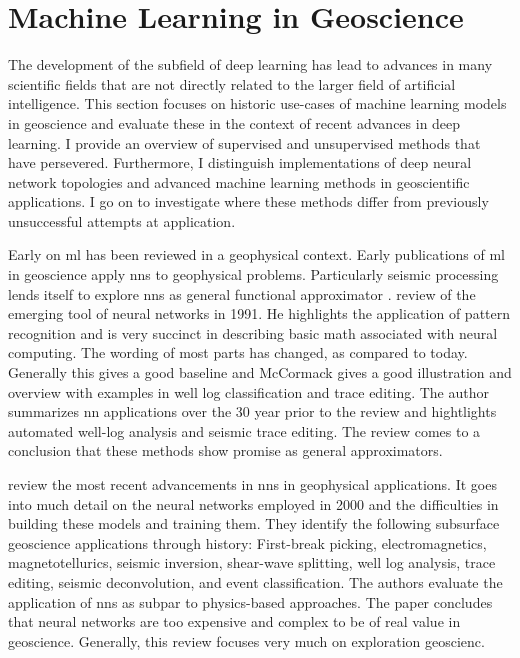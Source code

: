 \section{Machine Learning in Geoscience}
The development of the subfield of deep learning has lead to advances in many scientific fields that are not directly related to the larger field of artificial intelligence. This section focuses on historic use-cases of machine learning models in geoscience and evaluate these in the context of recent advances in deep learning. I provide an overview of supervised and unsupervised methods that have persevered. Furthermore, I distinguish implementations of deep neural network topologies and advanced machine learning methods in geoscientific applications. I go on to investigate where these methods differ from previously unsuccessful attempts at application.

Early on \acf{ml} has been reviewed in a geophysical context. Early publications of \ac{ml} in geoscience apply \acp{nn} to geophysical problems. Particularly seismic processing lends itself to explore \acp{nn} as general functional approximator \citep{Hornik1989-bl}. \citet{McCormack1991-pm} review of the emerging tool of neural networks in 1991. He highlights the application of pattern recognition and is very succinct in describing basic math associated with neural computing. The wording of most parts has changed, as compared to today. Generally this gives a good baseline and McCormack gives a good illustration and overview with examples in well log classification and trace editing. The author summarizes \ac{nn} applications over the 30 year prior to the review and hightlights automated well-log analysis and seismic trace editing. The review comes to a conclusion that these methods show promise as general approximators. 

\citet{Van_der_Baan2000-jz} review the most recent advancements in \acfp{nn} in geophysical applications. It goes into much detail on the neural networks employed in 2000 and the difficulties in building these models and training them. They identify the following subsurface geoscience applications through history: First-break picking, electromagnetics, magnetotellurics, seismic inversion, shear-wave splitting, well log analysis, trace editing, seismic deconvolution, and event classification. The authors evaluate the application of \acp{nn} as subpar to physics-based approaches. The paper concludes that neural networks are too expensive and complex to be of real value in geoscience. Generally, this review focuses very much on exploration geoscienc. 

